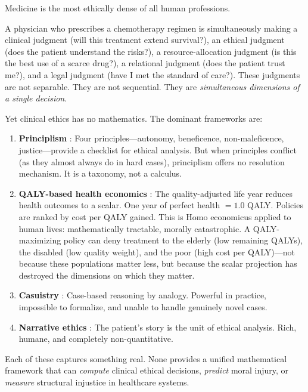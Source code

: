 \documentclass[12pt]{article}
\theoremstyle{definition}
\theoremstyle{remark}
\begin{document}
Medicine is the most ethically dense of all human professions.

A physician who prescribes a chemotherapy regimen is simultaneously making a clinical judgment (will this treatment extend survival?), an ethical judgment (does the patient understand the risks?), a resource-allocation judgment (is this the best use of a scarce drug?), a relational judgment (does the patient trust me?), and a legal judgment (have I met the standard of care?).  These judgments are not separable.  They are not sequential.  They are \emph{simultaneous dimensions of a single decision}.

Yet clinical ethics has no mathematics.  The dominant frameworks are:

\begin{enumerate}
    \item \textbf{Principlism} \cite{beauchamp2019}: Four principles---autonomy, beneficence, non-maleficence, justice---provide a checklist for ethical analysis.  But when principles conflict (as they almost always do in hard cases), principlism offers no resolution mechanism.  It is a taxonomy, not a calculus.

    \item \textbf{QALY-based health economics} \cite{weinstein1977,drummond2015}: The quality-adjusted life year reduces health outcomes to a scalar.  One year of perfect health $= 1.0$ QALY.  Policies are ranked by cost per QALY gained.  This is Homo economicus applied to human lives: mathematically tractable, morally catastrophic.  A QALY-maximizing policy can deny treatment to the elderly (low remaining QALYs), the disabled (low quality weight), and the poor (high cost per QALY)---not because these populations matter less, but because the scalar projection has destroyed the dimensions on which they matter.

    \item \textbf{Casuistry} \cite{jonsen1988}: Case-based reasoning by analogy.  Powerful in practice, impossible to formalize, and unable to handle genuinely novel cases.

    \item \textbf{Narrative ethics} \cite{charon2006}: The patient's story is the unit of ethical analysis.  Rich, humane, and completely non-quantitative.
\end{enumerate}

Each of these captures something real.  None provides a unified mathematical framework that can \emph{compute} clinical ethical decisions, \emph{predict} moral injury, or \emph{measure} structural injustice in healthcare systems.
\end{document}
